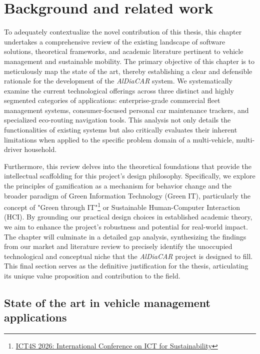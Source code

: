 \chapter{Background and related work}

To adequately contextualize the novel contribution of this thesis, this chapter undertakes a comprehensive review of the existing landscape of software solutions, theoretical frameworks, and academic literature pertinent to vehicle management and sustainable mobility. The primary objective of this chapter is to meticulously map the state of the art, thereby establishing a clear and defensible rationale for the development of the \textit{AlDiaCAR} system. We systematically examine the current technological offerings across three distinct and highly segmented categories of applications: enterprise-grade commercial fleet management systems, consumer-focused personal car maintenance trackers, and specialized eco-routing navigation tools. This analysis not only details the functionalities of existing systems but also critically evaluates their inherent limitations when applied to the specific problem domain of a multi-vehicle, multi-driver household.

\textgap

Furthermore, this review delves into the theoretical foundations that provide the intellectual scaffolding for this project's design philosophy. Specifically, we explore the principles of gamification as a mechanism for behavior change and the broader paradigm of Green Information Technology (Green IT), particularly the concept of "Green through IT"\footnote{\href{https://conf.researchr.org/home/ict4s-2026}{ICT4S 2026: International Conference on ICT for Sustainability}} or Sustainable Human-Computer Interaction (HCI). By grounding our practical design choices in established academic theory, we aim to enhance the project's robustness and potential for real-world impact. The chapter will culminate in a detailed gap analysis, synthesizing the findings from our market and literature review to precisely identify the unoccupied technological and conceptual niche that the \textit{AlDiaCAR} project is designed to fill. This final section serves as the definitive justification for the thesis, articulating its unique value proposition and contribution to the field.

\section{State of the art in vehicle management applications}

